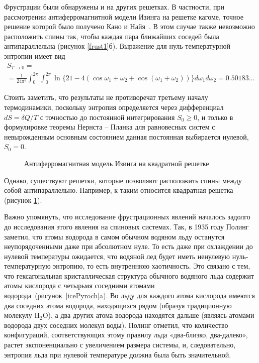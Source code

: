Фрустрации были обнаружены и на других решетках. В частности, при рассмотрении антиферромагнитной модели Изинга на решетке кагоме, точное решение которой было получено Кано и Найя~\cite{kano_naya1953}. В этом случае также невозможно расположить спины так, чтобы каждая пара ближайших соседей была антипараллельна (рисунок \ref{frust1}б). Выражение для нуль-температурной энтропии имеет вид
\begin{multline}
S_{T\rightarrow 0} = \\ = \frac{1}{24\pi^2} \int_{0}^{2\pi} \int_{0}^{2\pi} \ln \{21 - 4 (\cos \omega_1 + \omega_2 + \cos(\omega_1 + \omega_2))\} d\omega_1 d\omega_2 = 0.50183\dots
\end{multline} 

Стоить заметить, что результаты не противоречат третьему началу термодинамики, поскольку энтропия определяется через дифференциал $dS=\delta Q/T$ с точностью до постоянной интегрирования \mbox{$S_0 \geqslant 0$}, и только в формулировке теоремы Нернста – Планка для равновесных систем с невырожденным основным состоянием данная постоянная выбирается нулевой, $S_0 = 0$.

 \begin{figure}[h]
 	\caption{Антиферромагнитная модель Изинга на квадратной решетке}
 	\label{noFrustSquare}
 \end{figure}

Однако, существуют решетки, которые позволяют расположить спины между собой антипараллельно. Например, к таким относится квадратная решетка~\cite{onsager1941} (рисунок \ref{noFrustSquare}). 

Важно упомянуть, что исследование фрустрационных явлений началось задолго до исследования этого явления на спиновых системах. Так, в 1935 году Полинг \cite{pauling1935} заметил, что атомы водорода в самом обычном водяном льду останутся неупорядоченными даже при абсолютном нуле. То есть даже при охлаждении до нулевой температуры ожидается, что водяной лед будет иметь ненулевую нуль-температурную энтропию, то есть внутреннюю хаотичность. Это связано с тем, что гексагональная кристаллическая структура обычного водяного льда содержит атомы кислорода с четырьмя соседними атомами водорода~(рисунок~\ref{icePyroch}a). Во льду для каждого атома кислорода имеются два соседних атома водорода, находящихся рядом (образуя традиционную молекулу H$_2$O), а два других атома водорода находятся дальше (являясь атомами водорода двух соседних молекул воды). Полинг отметил, что количество конфигураций, соответствующих этому правилу льда «два-близко, два-далеко», растет экспоненциально с увеличением размера системы, и, следовательно, энтропия льда при нулевой температуре должна была быть значительной.

